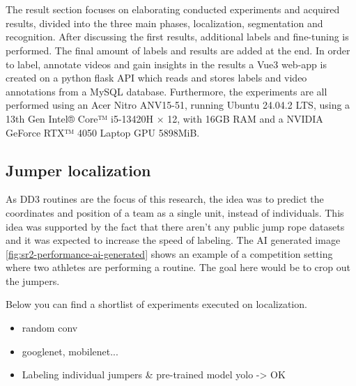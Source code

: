 
\chapter{}%
\label{ch:results}

The result section focuses on elaborating conducted experiments and acquired results, divided into the three main phases, localization, segmentation and recognition. After discussing the first results, additional labels and fine-tuning is performed. The final amount of labels and results are added at the end. In order to label, annotate videos and gain insights in the results a Vue3 web-app is created on a python flask API which reads and stores labels and video annotations from a MySQL database. Furthermore, the experiments are all performed using an Acer Nitro ANV15-51, running Ubuntu 24.04.2 LTS, using a 13th Gen Intel® Core™ i5-13420H × 12, with 16GB RAM and a NVIDIA GeForce RTX™ 4050 Laptop GPU 5898MiB.

\section{Jumper localization}

As DD3 routines are the focus of this research, the idea was to predict the coordinates and position of a team as a single unit, instead of individuals. This idea was supported by the fact that there aren't any public jump rope datasets and it was expected to increase the speed of labeling. The AI generated image \ref{fig:sr2-performance-ai-generated} shows an example of a competition setting where two athletes are performing a routine. The goal here would be to crop out the jumpers.


Below you can find a shortlist of experiments executed on localization.

\begin{itemize}
    \item random conv
    \item googlenet, mobilenet...
    \item Labeling individual jumpers \& pre-trained model yolo -> OK
\end{itemize}

